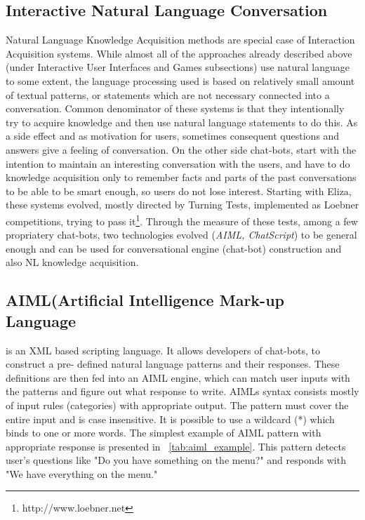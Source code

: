 \subsection{Interactive Natural Language Conversation}
Natural Language Knowledge Acquisition methods are special case of Interaction 
Acquisition systems. While almost all of the approaches already described above
(under Interactive User Interfaces and Games subsections) use natural language 
to some extent, the language processing used is based on relatively small amount
of textual patterns, or statements which are not necessary connected into a 
conversation. Common denominator of these systems is that they intentionally try
to acquire knowledge and then use natural language statements to do this. As a 
side effect and as motivation for users, sometimes consequent questions and 
answers give a feeling of conversation. On the other side chat-bots, start with
the intention to maintain an interesting conversation with the users, and have 
to do knowledge acquisition only to remember facts and parts of the past 
conversations to be able to be smart enough, so users do not lose interest.
Starting with Eliza\parencite{Weizenbaum1966}, these systems evolved, mostly 
directed by Turning Tests\parencite{Turing?}, implemented as Loebner 
competitions, trying to pass it\footnote{http://www.loebner.net}. Through the 
measure of these tests\parencite{Bradesko2012}, among a few propriatery 
chat-bots, two technologies evolved (\emph{AIML, ChatScript}) to be general 
enough and can be used for conversational engine (chat-bot) construction and 
also NL knowledge acquisition.

\subsection{AIML(Artificial Intelligence Mark-up Language} is an XML based 
scripting language. It allows developers of chat-bots, to construct a pre-
defined natural language patterns and their responses. These definitions are 
then fed into an AIML engine, which can match user inputs with the patterns and 
figure out what response to write. AIMLs syntax consists mostly of input rules 
(categories) with appropriate output. The pattern must cover the entire input 
and is case insensitive. It is possible to use a wildcard (*) which binds to 
one or more words. The simplest example of AIML pattern with appropriate 
response is presented in \tablename~\ref{tab:aiml_example}. This pattern 
detects user's questions like "Do you have something on the menu?" and responds 
with "We have everything on the menu."

